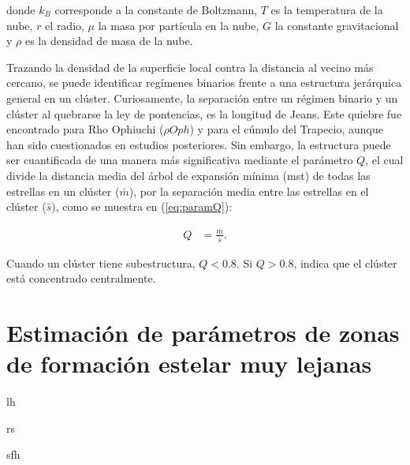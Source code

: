 donde $k_B$ corresponde a la constante de Boltzmann, $T$ es la temperatura de la nube, $r$ el radio, $\mu$ la masa por partícula en la nube, $G$ la constante gravitacional y $\rho$ es la densidad de masa de la nube.

Trazando la densidad de la superficie local contra la distancia al vecino más cercano, se puede identificar regímenes binarios frente a una estructura jerárquica general en un clúster. Curiosamente, la separación entre un r\'egimen binario y un clúster al quebrarse la ley de pontencias, es la longitud de Jeans. Este quiebre fue encontrado para Rho Ophiuchi ($\rho Oph$) y para el cúmulo del Trapecio, aunque han sido cuestionados en estudios posteriores. Sin embargo, la estructura puede ser cuantificada de una manera más significativa mediante el parámetro $Q$, el cual divide la distancia media del árbol de expansión mínima (\gls{mst}) de todas las estrellas en un clúster ($\bar{m}$), por la separación media entre las estrellas en el clúster ($\bar{s}$), como se muestra en (\ref{eq:paramQ}):

\begin{align}\label{eq:paramQ}
	Q &= \frac{\bar{m}}{\bar{s}}.
\end{align}

Cuando un clúster tiene subestructura, $Q < 0.8$. Si $Q > 0.8$, indica que el clúster está concentrado centralmente.

\section{Estimación de parámetros de zonas de formación estelar muy lejanas}

\gls{lh}

\gls{rs}

\gls{sfh}
